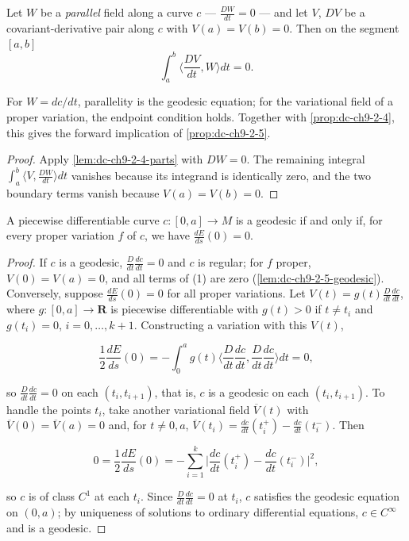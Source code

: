 \begin{lemma}
  \label{lem:dc-ch9-2-5-geodesic}
  \leanok
  Let $W$ be a \emph{parallel} field along a curve $c$ --- $\frac{DW}{dt}=0$ --- and let
  $V$, $DV$ be a covariant-derivative pair along $c$ with $V(a)=V(b)=0$. Then on the
  segment $[a,b]$
  $$
  \int_a^b\Big\langle\frac{DV}{dt},W\Big\rangle dt=0.
  $$

  For $W=dc/dt$, parallelity is the geodesic equation; for the variational
  field of a proper variation, the endpoint condition holds. Together with
  \cref{prop:dc-ch9-2-4}, this gives the forward implication of
  \cref{prop:dc-ch9-2-5}.
\end{lemma}
\begin{proof}
  \leanok
  \sketch
  Apply \cref{lem:dc-ch9-2-4-parts} with $DW=0$. The remaining integral
  $\int_a^b\langle V,\frac{DW}{dt}\rangle dt$ vanishes because its integrand is
  identically zero, and the two boundary terms vanish because $V(a)=V(b)=0$.
\end{proof}
\begin{proposition}
  \label{prop:dc-ch9-2-5}
  A piecewise differentiable curve $c:[0,a]\to M$ is a geodesic if and only if, for
  every proper variation $f$ of $c$, we have $\frac{dE}{ds}(0)=0$.
\end{proposition}
\begin{proof}
  \sketch
  If $c$ is a geodesic, $\frac{D}{dt}\frac{dc}{dt}=0$ and $c$ is regular;
  for $f$ proper, $V(0)=V(a)=0$, and all terms of (1) are zero
  (\cref{lem:dc-ch9-2-5-geodesic}). Conversely, suppose
  $\frac{dE}{ds}(0)=0$ for all proper variations. Let
  $V(t)=g(t)\frac{D}{dt}\frac{dc}{dt}$, where $g:[0,a]\to\mathbf{R}$ is piecewise
  differentiable with $g(t)>0$ if $t\ne t_i$ and $g(t_i)=0$, $i=0,\dots,k+1$.
  Constructing a variation
  with this $V(t)$,

  $$
  \frac{1}{2}\frac{dE}{ds}(0)=-\int_0^a g(t)\Big\langle\frac{D}{dt}\frac{dc}{dt},\frac{D}{dt}\frac{dc}{dt}\Big\rangle dt=0,
  $$

  so $\frac{D}{dt}\frac{dc}{dt}=0$ on each $(t_i,t_{i+1})$, that is, $c$ is a geodesic
  on each $(t_i,t_{i+1})$. To handle the points $t_i$, take another variational field
  $\overline V(t)$ with $\overline V(0)=\overline V(a)=0$ and, for $t\ne 0,a$,
  $\overline V(t_i)=\frac{dc}{dt}(t_i^+)-\frac{dc}{dt}(t_i^-)$. Then

  $$
  0=\frac{1}{2}\frac{dE}{ds}(0)=-\sum_{i=1}^k\Big|\frac{dc}{dt}(t_i^+)-\frac{dc}{dt}(t_i^-)\Big|^2,
  $$

  so $c$ is of class $C^1$ at each $t_i$. Since $\frac{D}{dt}\frac{dc}{dt}=0$ at
  $t_i$, $c$ satisfies the geodesic equation on $(0,a)$; by uniqueness of solutions
  to ordinary differential equations, $c\in C^\infty$ and is a geodesic.
\end{proof}
